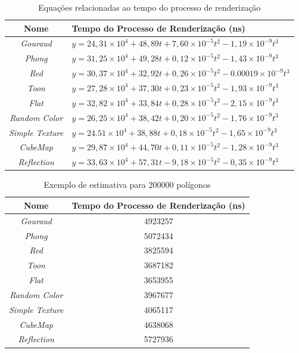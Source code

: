 	\begin{table}[ht]
	\centering	
	\begin{tabularx}{0.9\textwidth}{cX}
		\toprule
		\textbf{Nome} & \textbf{Tempo do Processo de Renderização (ns)}  \\
		\midrule
		\textit{Gouraud} &  $y = 24,31 \times 10^4 + 48,89t + 7,60 \times 10^{-5}t^2 - 1,19 \times 10^{-9}t^3$\\
		\textit{Phong} &   $y = 31,25 \times 10^4 + 49,28t + 0,12 \times 10^{-5}t^2 - 1,43 \times 10^{-9}t^3$\\
		\textit{Red} & $y = 30,37 \times 10^4 + 32,92t + 0,26 \times 10^{-5}t^2 - 0.00019 \times 10^{-9}t^3$\\
		\textit{Toon} & $y = 27,28 \times 10^4 + 37,30t + 0,23 \times 10^{-5}t^2 - 1,93 \times 10^{-9}t^3$\\
		\textit{Flat} & $y = 32,82 \times 10^4 + 33,84t + 0,28 \times 10^{-5}t^2 - 2,15 \times 10^{-9}t^3$\\
		\textit{Random Color} & $y = 26,25 \times 10^4 + 38,42t + 0,20 \times 10^{-5}t^2 - 1,76 \times 10^{-9}t^3$\\
		\textit{Simple Texture} & $y = 24.51 \times 10^4 + 38,88t + 0,18 \times 10^{-5}t^2 - 1,65 \times 10^{-9}t^3$\\
		\textit{CubeMap} & $y = 29,87 \times 10^4 + 44,70t + 0,11 \times 10^{-5}t^2 - 1,28 \times 10^{-9}t^3$\\
		\textit{Reflection} & $y = 33,63 \times 10^4 + 57,31t - 9,18 \times 10^{-5}t^2 - 0,35\times 10^{-9}t^3$ \\
		
		\bottomrule
	\end{tabularx}
	\caption{Equações relacionadas ao tempo do processo de renderização}
	\label{eqrender}
	\end{table}

	\begin{table}[ht]
	\centering	
	\begin{tabularx}{0.9\textwidth}{cc}
		\toprule
		\textbf{Nome} & \textbf{Tempo do Processo de Renderização (ns)}  \\
		\midrule
		\textit{Gouraud} &  4923257\\
		\textit{Phong} &   5072434\\
		\textit{Red} & 3825594\\
		\textit{Toon} & 3687182\\
		\textit{Flat} & 3653955\\
		\textit{Random Color} & 3967677\\
		\textit{Simple Texture} & 4065117\\
		\textit{CubeMap} & 4638068\\
		\textit{Reflection} & 5727936\\
	
	
		\bottomrule
	\end{tabularx}
	\caption{Exemplo de estimativa para 200000 polígonos}
	\label{estimativa}
	\end{table}

